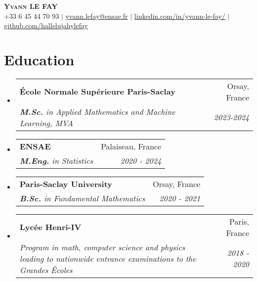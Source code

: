 \documentclass[letterpaper,10pt]{article}
\makeatletter
\newcommand{\resumeItem}[1]{
    \item\small{
            {#1 \vspace{-2pt}}
    }
}
\newcommand{\resumeSubheading}[4]{
    \vspace{-2pt}\item
    \begin{tabular*}{0.97\textwidth}[t]{l@{\extracolsep{\fill}}r}
        \textbf{#1}       & #2                 \\
        \textit{\small#3} & \textit{\small #4} \\
    \end{tabular*}\vspace{-7pt}
}
\newcommand{\resumeSubHeadingListStart}{\begin{itemize}[leftmargin=0.15in, label={}]}
\newcommand{\resumeSubHeadingListEnd}{\end{itemize}}
\newcommand{\resumeItemListStart}{\begin{itemize}}
\newcommand{\resumeItemListEnd}{\end{itemize}\vspace{-5pt}}
\makeatother
\begin{document}

\begin{center}
\textbf{\scshape Yvann LE FAY} \\ \vspace{1pt}
\small +33 6 45 44 70 93 $|$ \href{mailto:yvann.lefay@ensae.fr}{yvann.lefay@ensae.fr} $|$
\href{https://linkedin.com/in/yvann-le-fay/}{linkedin.com/in/yvann-le-fay/} $|$
\href{https://github.com/hallelujahylefay}{github.com/hallelujahylefay}
\end{center}


\section{Education}
\resumeSubHeadingListStart
\resumeSubheading
{\'Ecole Normale Supérieure Paris-Saclay}{Orsay, France}{\textbf{M.Sc.} in Applied Mathematics and Machine Learning, MVA}{2023-2024}
\resumeSubheading
{ENSAE}{Palaiseau, France}{\textbf{M.Eng.} in Statistics}{2020 - 2024}
\resumeSubheading
{Paris-Saclay University}{Orsay, France}{\textbf{B.Sc.} in Fundamental Mathematics }
{2020 - 2021}
\resumeSubheading{Lycée Henri-IV}{Paris, France}
{Program in math, computer science and physics leading to nationwide entrance examinations to the \textit{Grandes Écoles}}{2018 - 2020}
\resumeSubHeadingListEnd
\end{document}
